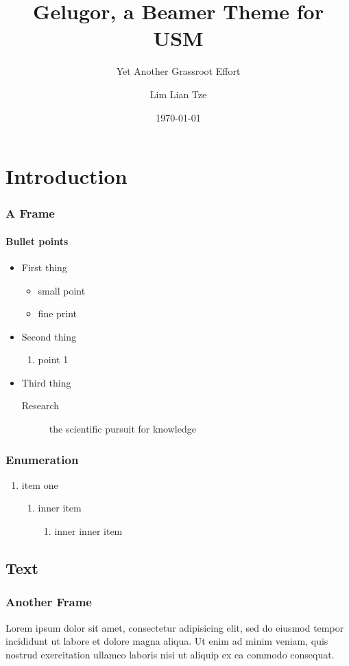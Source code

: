 \documentclass{beamer}
\title{Gelugor, a Beamer Theme for USM}
\subtitle{Yet Another Grassroot Effort}
\author{Lim Lian Tze}
\date{\today}
\institute[testing]{\url{liantze@gmail.com}\\\url{http://liantze.penguinattack.org/}}
\begin{document}
\maketitle


\section{Introduction}
\begin{frame}
\frametitle{A Frame}
\framesubtitle{Bullet points}
\begin{itemize}
\item First thing
	\begin{itemize}
	\item small point
	\item fine print
	\end{itemize}
\item Second thing
	\begin{enumerate}
	\item point 1
	\end{enumerate}
\item Third thing
	\begin{description}
	\item[Research] the scientific pursuit for knowledge
	\end{description}
\end{itemize}
\end{frame}

\begin{frame}
  \frametitle{Enumeration}
  \begin{enumerate}
    \item item one
      \begin{enumerate}
        \item inner item
          \begin{enumerate}
            \item inner inner item
          \end{enumerate}
      \end{enumerate}
  \end{enumerate}
\end{frame}

\subsection{Text}
\begin{frame}
\frametitle{Another Frame}
Lorem ipsum dolor sit amet, consectetur adipisicing elit, sed do eiusmod tempor incididunt ut labore et dolore magna aliqua. Ut enim ad minim veniam, quis nostrud exercitation ullamco laboris nisi ut aliquip ex ea commodo consequat.
\end{frame}
\end{document}
